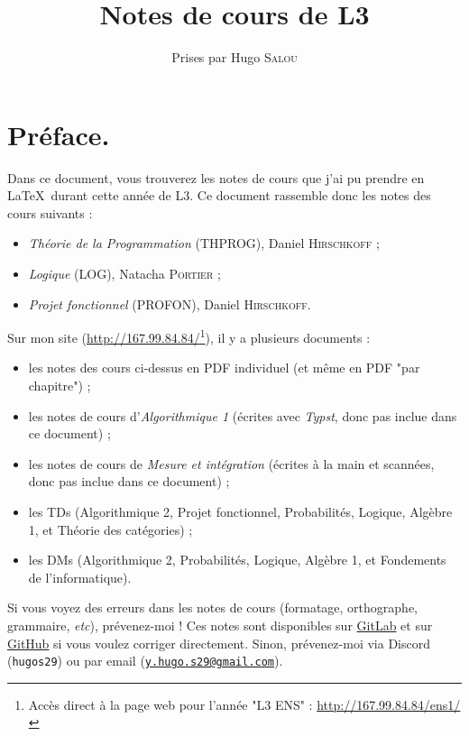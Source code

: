 \documentclass{notes}
\title{Notes de cours de L3}
\author{Prises par Hugo \textsc{Salou}}
\begin{document}
  \maketitle

  \dominitoc
  \pagebreak
  \tableofcontents

  \chapter*{Préface.} 

  Dans ce document, vous trouverez les notes de cours que j'ai pu prendre en \LaTeX\ durant cette année de L3.
  Ce document rassemble donc les notes des cours suivants :
  \begin{itemize}
    \item \textit{Théorie de la Programmation} (THPROG), Daniel \textsc{Hirschkoff} ;
    \item \textit{Logique} (LOG), Natacha \textsc{Portier} ;
    \item \textit{Projet fonctionnel} (PROFON), Daniel \textsc{Hirschkoff}.
  \end{itemize}

  Sur mon site (\url{http://167.99.84.84/}\footnote{Accès direct à la page web pour l'année "L3 ENS" : \url{http://167.99.84.84/ens1/}}\showfootnote), il y a plusieurs documents :
  \begin{itemize}
    \item les notes des cours ci-dessus en PDF individuel (et même en PDF "par chapitre") ;
    \item les notes de cours d'\textit{Algorithmique 1} (écrites avec \textit{Typst}, donc pas inclue dans ce document) ;
    \item les notes de cours de \textit{Mesure et intégration} (écrites à la main et scannées, donc pas inclue dans ce document) ;
    \item les TDs (Algorithmique 2, Projet fonctionnel, Probabilités, Logique, Algèbre 1, et Théorie des catégories) ;
    \item les DMs (Algorithmique 2, Probabilités, Logique, Algèbre 1, et Fondements de l'informatique).
  \end{itemize}

  Si vous voyez des erreurs dans les notes de cours (formatage, orthographe, grammaire, \textit{etc}), prévenez-moi !
  Ces notes sont disponibles sur \href{https://gitlab.aliens-lyon.fr/hsalou/cours-l3}{GitLab} et sur \href{https://github.com/hugo-s29/ens-1-cours}{GitHub} si vous voulez corriger directement.
  Sinon, prévenez-moi via Discord (\texttt{hugos29}) ou par email (\href{mailto:y.hugo.s29@gmail.com}{\texttt{y.hugo.s29@gmail.com}}).
\end{document}
